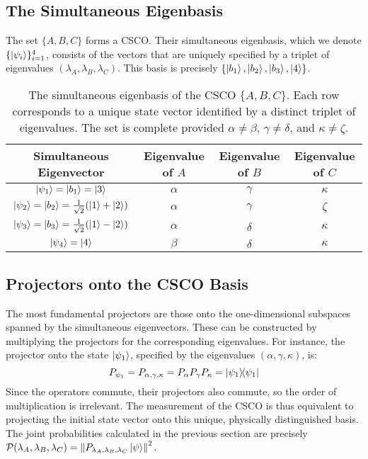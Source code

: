 \documentclass[11pt,a4paper]{article}
\begin{document}
\subsection{The Simultaneous Eigenbasis}
The set $\{A, B, C\}$ forms a CSCO. Their simultaneous eigenbasis, which we
denote $\{\ket{\psi_i}\}_{i=1}^4$, consists of the vectors that are uniquely
specified by a triplet of eigenvalues $(\lambda_A, \lambda_B, \lambda_C)$. This
basis is precisely $\{\ket{b_1}, \ket{b_2}, \ket{b_3}, \ket{4}\}$.

\begin{table}[ht!]
  \centering
  \renewcommand{\arraystretch}{1.5}
  \begin{tabular}{c | c c c}
    \hline\hline
    \textbf{Simultaneous Eigenvector} & \textbf{Eigenvalue of $A$} &
    \textbf{Eigenvalue of $B$} & \textbf{Eigenvalue of $C$} \\
    \hline
    $\ket{\psi_1} = \ket{b_1} = \ket{3}$ & $\alpha$ & $\gamma$ & $\kappa$ \\
    $\ket{\psi_2} = \ket{b_2} = \frac{1}{\sqrt{2}}(\ket{1}+\ket{2})$ & $\alpha$ & $\gamma$ & $\zeta$ \\
    $\ket{\psi_3} = \ket{b_3} = \frac{1}{\sqrt{2}}(\ket{1}-\ket{2})$ & $\alpha$ & $\delta$ & $\kappa$ \\
    $\ket{\psi_4} = \ket{4}$ & $\beta$ & $\delta$ & $\kappa$ \\
    \hline\hline
  \end{tabular}
  \caption{The simultaneous eigenbasis of the CSCO $\{A, B, C\}$. Each row
  corresponds to a unique state vector identified by a distinct triplet of
eigenvalues. The set is complete provided $\alpha \neq \beta$, $\gamma \neq
\delta$, and $\kappa \neq \zeta$.}
  \label{tab:csco_summary}
\end{table}

\subsection{Projectors onto the CSCO Basis}
The most fundamental projectors are those onto the one-dimensional subspaces
spanned by the simultaneous eigenvectors. These can be constructed by
multiplying the projectors for the corresponding eigenvalues. For instance, the
projector onto the state $\ket{\psi_1}$, specified by the eigenvalues $(\alpha,
\gamma, \kappa)$, is:
$$ P_{\psi_1} = P_{\alpha,\gamma,\kappa} = P_\alpha P_\gamma P_\kappa =
\dyad{\psi_1}{\psi_1}$$
Since the operators commute, their projectors also commute, so the order of
multiplication is irrelevant. The measurement of the CSCO is thus equivalent to
projecting the initial state vector onto this unique, physically distinguished
basis. The joint probabilities calculated in the previous section are precisely
$\mathcal{P}(\lambda_A, \lambda_B, \lambda_C) =
\norm{P_{\lambda_A,\lambda_B,\lambda_C}\ket{\psi}}^2$.
\end{document}
